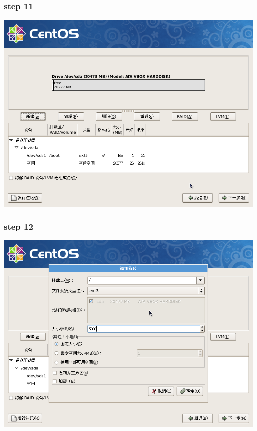 \documentclass[xcolor=svgnames,presentation]{beamer}
\begin{document}
\begin{frame}
\frametitle{step 11}
\label{sec-2-11}

\begin{center}
\includegraphics[width=.9\linewidth]{img/img17.png}
\end{center}
\end{frame}
\begin{frame}
\frametitle{step 12}
\label{sec-2-12}

\begin{center}
\includegraphics[width=.9\linewidth]{img/img18.png}
\end{center}
\end{frame}
\end{document}
